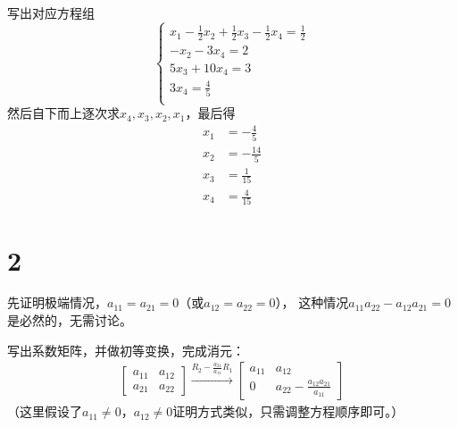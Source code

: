 \documentclass{article}
\begin{document}
写出对应方程组
\begin{equation*}
  \begin{cases*}
    x_1 - \frac{1}{2} x_2 + \frac{1}{2} x_3 - \frac{1}{2} x_4 = \frac{1}{2} \\
    -x_2  - 3 x_4 = 2                                                       \\
    5 x_3 + 10 x_4 = 3                                                      \\
    3 x_4 = \frac{4}{5}                                                     \\
  \end{cases*}
\end{equation*}
然后自下而上逐次求$x_4, x_3, x_2, x_1$，最后得
\begin{align*}
  x_1 & = - \frac{4}{5}  \\
  x_2 & = - \frac{14}{5} \\
  x_3 & = \frac{1}{15}   \\
  x_4 & = \frac{4}{15}
\end{align*}

\section*{2}

先证明极端情况，$a_{11} = a_{21} = 0$（或$a_{12} = a_{22} = 0$），
这种情况$a_{11}a_{22} - a_{12} a_{21} = 0$是必然的，无需讨论。

写出系数矩阵，并做初等变换，完成消元：
\begin{align*}
  \begin{bmatrix}
    a_{11} & a_{12} \\
    a_{21} & a_{22}
  \end{bmatrix}
  \xrightarrow{R_2 - \frac{a_{21}}{a_{11}} R_1}
  \begin{bmatrix}
    a_{11} & a_{12}                                \\
    0      & a_{22} - \frac{a_{12} a_{21}}{a_{11}}
  \end{bmatrix}
\end{align*}
（这里假设了$a_{11} \neq 0$，$a_{12} \neq 0$证明方式类似，只需调整方程顺序即可。）
\end{document}
